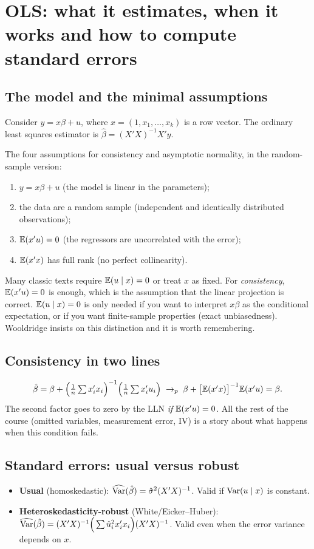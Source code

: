 \chapter{OLS: what it estimates, when it works and how to compute standard errors}
\label{cap:mqo}

\section{The model and the minimal assumptions}
Consider $y=x\beta+u$, where $x=(1,x_1,\dots,x_k)$ is a row vector. The ordinary least squares estimator is $\hat\beta=(X'X)^{-1}X'y$.

The four assumptions for consistency and asymptotic normality, in the random-sample version:
\begin{enumerate}[leftmargin=1.6em]
\item $y=x\beta+u$ (the model is linear in the parameters);
\item the data are a random sample (independent and identically distributed observations);
\item $\mathbb{E}(x'u)=0$ (the regressors are uncorrelated with the error);
\item $\mathbb{E}(x'x)$ has full rank (no perfect collinearity).
\end{enumerate}

\begin{atencao}
Many classic texts require $\mathbb{E}(u\mid x)=0$ or treat $x$ as fixed. For \emph{consistency}, $\mathbb{E}(x'u)=0$ is enough, which is the assumption that the linear projection is correct. $\mathbb{E}(u\mid x)=0$ is only needed if you want to interpret $x\beta$ as the conditional expectation, or if you want finite-sample properties (exact unbiasedness). Wooldridge insists on this distinction and it is worth remembering.
\end{atencao}

\section{Consistency in two lines}
\[
\hat\beta=\beta+\Big(\tfrac1n\textstyle\sum x_i'x_i\Big)^{-1}\Big(\tfrac1n\sum x_i'u_i\Big)\;\to_p\;\beta+\big[\mathbb{E}(x'x)\big]^{-1}\mathbb{E}(x'u)=\beta.
\]
The second factor goes to zero by the LLN \emph{if} $\mathbb{E}(x'u)=0$. All the rest of the course (omitted variables, measurement error, IV) is a story about what happens when this condition fails.

\section{Standard errors: usual versus robust}
\begin{itemize}[leftmargin=1.4em]
\item \textbf{Usual} (homoskedastic): $\widehat{\operatorname{Var}}(\hat\beta)=\hat\sigma^2(X'X)^{-1}$. Valid if $\operatorname{Var}(u\mid x)$ is constant.
\item \textbf{Heteroskedasticity-robust} (White/Eicker--Huber): $\widehat{\operatorname{Var}}(\hat\beta)=(X'X)^{-1}\Big(\sum\hat u_i^2x_i'x_i\Big)(X'X)^{-1}$. Valid even when the error variance depends on $x$.
\end{itemize}

